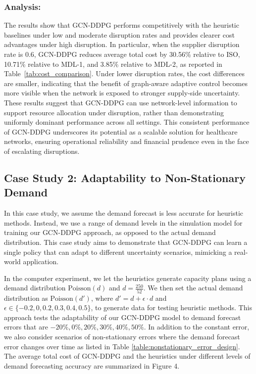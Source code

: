 \documentclass[preprint,review,12pt,nonatbib]{elsarticle}
\begin{document}
\subsubsection{Analysis:}
The results show that GCN-DDPG performs competitively with the heuristic baselines under low and moderate disruption rates and provides clearer cost advantages under high disruption. In particular, when the supplier disruption rate is $0.6$, GCN-DDPG reduces average total cost by 30.56\% relative to ISO, 10.71\% relative to MDL-1, and 3.85\% relative to MDL-2, as reported in Table~\ref{tab:cost_comparison}. Under lower disruption rates, the cost differences are smaller, indicating that the benefit of graph-aware adaptive control becomes more visible when the network is exposed to stronger supply-side uncertainty. These results suggest that GCN-DDPG can use network-level information to support resource allocation under disruption, rather than demonstrating uniformly dominant performance across all settings. This consistent performance of GCN-DDPG underscores its potential as a scalable solution for healthcare networks, ensuring operational reliability and financial prudence even in the face of escalating disruptions.
\subsection{Case Study 2: Adaptability to Non-Stationary Demand}
\label{subsec:casestudy2}
In this case study, we assume the demand forecast is less accurate for heuristic methods. Instead, we use a range of demand levels in the simulation model for training our GCN-DDPG approach, as opposed to the actual demand distribution. This case study aims to demonstrate that GCN-DDPG can learn a single policy that can adapt to different uncertainty scenarios, mimicking a real-world application.

In the computer experiment, we let the heuristics generate capacity plans using a demand distribution \( \text{Poisson}(d) \) and \( d = \frac{250}{52} \). We then set the actual demand distribution as \( \text{Poisson}(d') \), where \( d' = d + \epsilon \cdot d \) and \( \epsilon \in \{-0.2, 0, 0.2, 0.3, 0.4, 0.5\} \), to generate data for testing heuristic methods. This approach tests the adaptability of our GCN-DDPG model to demand forecast errors that are \(-20\%, 0\%, 20\%, 30\%, 40\%, 50\% \). In addition to the constant error, we also consider scenarios of non-stationary errors where the demand forecast error changes over time as listed in Table \ref{table:nonstationary_error_design}.
 The average total cost of GCN-DDPG and the heuristics under different levels of demand forecasting accuracy are summarized
in Figure 4.
\end{document}

